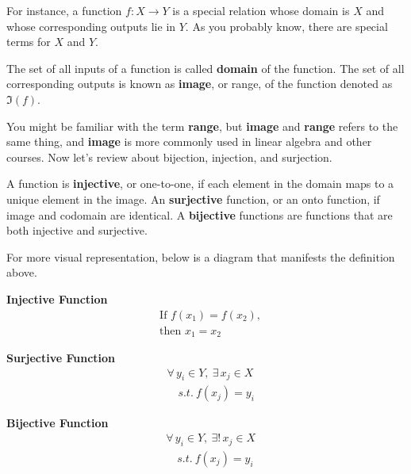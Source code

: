 \documentclass[../main.tex]{subfiles}
\begin{document}
For instance, a function $f: X \to Y$ is a special relation whose
domain is $X$ and whose corresponding outputs lie in $Y$. As you
probably know, there are special terms for $X$ and $Y$.

\begin{definition}
The set of all inputs of a function is called \textbf{domain} of the
function. The set of all corresponding outputs is known as
\textbf{image}, or range, of the function denoted as $\Im(f)$.
\end{definition}

You might be familiar with the term \textbf{range}, but \textbf{image}
and \textbf{range} refers to the same thing, and \textbf{image} is
more commonly used in linear algebra and other courses. Now let's
review about bijection, injection, and surjection.

\begin{definition}
A function is \textbf{injective}, or one-to-one, if each element in
the domain maps to a unique element in the image. An
\textbf{surjective} function, or an onto function, if image and
codomain are identical. A \textbf{bijective} functions are functions
that are both injective and surjective.
\end{definition}

For more visual representation, below is a diagram that manifests
the definition above.

\begin{minipage}{0.32\textwidth}
\begin{center}
\textbf{Injective Function}
\begin{align*}
    &\text{If } f(x_1) = f(x_2), \\
    &\text{then } x_1 = x_2
\end{align*}
\end{center}
\end{minipage}
\begin{minipage}{0.32\textwidth}
\begin{center}
\textbf{Surjective Function}
\begin{align*}
    &\forall\, y_i \in Y,\ \exists\, x_j \in X \\
    &\quad s.t.\ f(x_j) = y_i
\end{align*}
\end{center}
\end{minipage}
\begin{minipage}{0.32\textwidth}
\begin{center}
\textbf{Bijective Function}
\begin{align*}
    &\forall\, y_i \in Y,\ \exists!\, x_j \in X \\
    &\quad s.t.\ f(x_j) = y_i
\end{align*}
\end{center}
\end{minipage}
\end{document}
